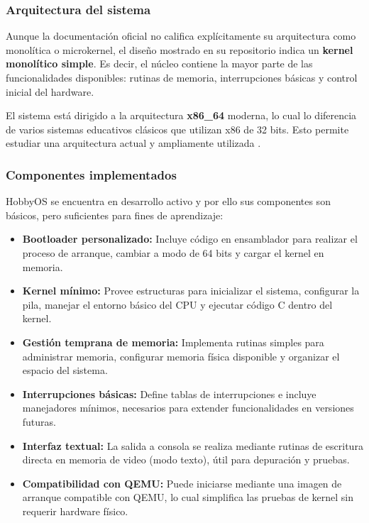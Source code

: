 \subsubsection{Arquitectura del sistema}

Aunque la documentación oficial no califica explícitamente su arquitectura como monolítica o microkernel, el diseño mostrado en su repositorio indica un \textbf{kernel monolítico simple}. Es decir, el núcleo contiene la mayor parte de las funcionalidades disponibles: rutinas de memoria, interrupciones básicas y control inicial del hardware.

El sistema está dirigido a la arquitectura \textbf{x86\_64} moderna, lo cual lo diferencia de varios sistemas educativos clásicos que utilizan x86 de 32 bits. Esto permite estudiar una arquitectura actual y ampliamente utilizada \cite{hobbyos_repo}.

\subsubsection{Componentes implementados}

HobbyOS se encuentra en desarrollo activo y por ello sus componentes son básicos, pero suficientes para fines de aprendizaje:

\begin{itemize}
    \item \textbf{Bootloader personalizado:} Incluye código en ensamblador para realizar el proceso de arranque, cambiar a modo de 64 bits y cargar el kernel en memoria.
    
    \item \textbf{Kernel mínimo:} Provee estructuras para inicializar el sistema, configurar la pila, manejar el entorno básico del CPU y ejecutar código C dentro del kernel.

    \item \textbf{Gestión temprana de memoria:} Implementa rutinas simples para administrar memoria, configurar memoria física disponible y organizar el espacio del sistema.

    \item \textbf{Interrupciones básicas:} Define tablas de interrupciones e incluye manejadores mínimos, necesarios para extender funcionalidades en versiones futuras.

    \item \textbf{Interfaz textual:} La salida a consola se realiza mediante rutinas de escritura directa en memoria de video (modo texto), útil para depuración y pruebas.

    \item \textbf{Compatibilidad con QEMU:} Puede iniciarse mediante una imagen de arranque compatible con QEMU, lo cual simplifica las pruebas de kernel sin requerir hardware físico.
\end{itemize}

